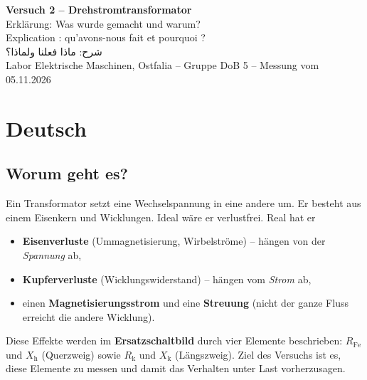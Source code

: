 \documentclass[a4paper,11pt]{article}
\begin{document}
\begin{center}
{\LARGE\bfseries\color{dunkelblau} Versuch 2 -- Drehstromtransformator}\\[0.4em]
{\large Erklärung: Was wurde gemacht und warum?}\\[0.2em]
{\large\textfrench{Explication : qu'avons-nous fait et pourquoi ?}}\\[0.2em]
{\large\textarabic{شرح: ماذا فعلنا ولماذا؟}}\\[0.8em]
Labor Elektrische Maschinen, Ostfalia -- Gruppe DoB 5 -- Messung vom 05.11.2026
\end{center}

\tableofcontents
\newpage

\section{Deutsch}

\subsection{Worum geht es?}
Ein Transformator setzt eine Wechselspannung in eine andere um. Er besteht aus einem Eisenkern und Wicklungen. Ideal wäre er verlustfrei. Real hat er
\begin{itemize}[nosep]
  \item \textbf{Eisenverluste} (Ummagnetisierung, Wirbelströme) -- hängen von der \emph{Spannung} ab,
  \item \textbf{Kupferverluste} (Wicklungswiderstand) -- hängen vom \emph{Strom} ab,
  \item einen \textbf{Magnetisierungsstrom} und eine \textbf{Streuung} (nicht der ganze Fluss erreicht die andere Wicklung).
\end{itemize}
Diese Effekte werden im \textbf{Ersatzschaltbild} durch vier Elemente beschrieben: $R_\mathrm{Fe}$ und $X_\mathrm{h}$ (Querzweig) sowie $R_\mathrm{k}$ und $X_\mathrm{k}$ (Längszweig). Ziel des Versuchs ist es, diese Elemente zu messen und damit das Verhalten unter Last vorherzusagen.
\end{document}
